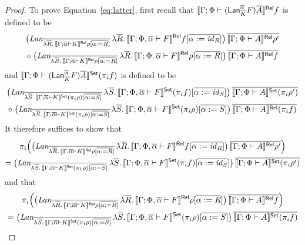 \documentclass{lmcs}
\theoremstyle{plain}\newtheorem{satz}[thm]{Satz}
\renewcommand{\id}{\mathit{id}}
\begin{document}
{\begin{proof}
To prove Equation~\ref{eq:latter}, first recall that
$\llbracket{ \Gamma; \Phi \vdash (\mathsf{Lan}^{\overline{\alpha}}_{\overline{K}} F)\overline{A} }\rrbracket^{\mathsf{Rel}}
f$ is defined to be
\begin{multline*}
\big(\textit{Lan}_{\ol{\lambda \ol{R}.\,\relsem{\Gamma; \ol\alpha
      \vdash K}\rho[\ol{\alpha := R}]}}\, \lambda
\ol{R}.\,\relsem{\Gamma; \Phi, \ol\alpha \vdash F}f[\ol{\alpha :=
    \id_R}]\big)\, \ol{\relsem{\Gamma; \Phi \vdash A}\rho'} \\ \circ\;
\big(\textit{Lan}_{\ol{\lambda \ol{R}.\,\relsem{\Gamma; \ol\alpha
      \vdash K}\rho[\ol{\alpha := R}]}}\, \lambda
\ol{R}.\,\relsem{\Gamma; \Phi, \ol\alpha \vdash F}\rho[\ol{\alpha :=
    R}]\big)\, \ol{\relsem{\Gamma; \Phi \vdash A}f}
\end{multline*}
and $\llbracket{\Gamma; \Phi \vdash (\mathsf{Lan}^{\overline{\alpha}}_{\overline{K}} F)\overline{A}
}\rrbracket^{\mathsf{Set}} (\pi_i f)$ is defined to be
\begin{multline*}
\big(\textit{Lan}_{\ol{\lambda \ol{S}.\,\setsem{\Gamma; \ol\alpha
      \vdash K}(\pi_i \rho)[\ol{\alpha := S}]}}\, \lambda
\ol{S}.\,\setsem{\Gamma; \Phi, \ol\alpha \vdash F}(\pi_i f)[\ol{\alpha
    := \id_S}]\big)\, \ol{\setsem{\Gamma; \Phi \vdash A}(\pi_i
  \rho')}\\ \circ\; \big(\textit{Lan}_{\ol{\lambda
    \ol{S}.\,\setsem{\Gamma; \ol\alpha \vdash K}(\pi_i
    \rho)[\ol{\alpha := S}]}}\, \lambda \ol{S}.\,\setsem{\Gamma; \Phi,
  \ol\alpha \vdash F}(\pi_i \rho)[\ol{\alpha := S}]\big)\,
\ol{\relsem{\Gamma; \Phi \vdash A}(\pi_i f)}
\end{multline*}
It therefore suffices to show that
\begin{multline}\label{eq:part-one}
\pi_i \Big( \big(\textit{Lan}_{\ol{\lambda \ol{R}.\,\relsem{\Gamma; \ol\alpha
      \vdash K}\rho[\ol{\alpha := R}]}}\,  
      \lambda \ol{R}.\,\relsem{\Gamma; \Phi, \ol\alpha \vdash F}f[\ol{\alpha := \id_R}]\big)\,
    \ol{\relsem{\Gamma; \Phi \vdash A}\rho'} \Big) \\
= \big(\textit{Lan}_{\ol{\lambda \ol{S}.\,\setsem{\Gamma; \ol\alpha
      \vdash K} (\pi_1 \rho) [\ol{\alpha := S}]}}\,  
      \lambda \ol{S}.\,\setsem{\Gamma; \Phi, \ol\alpha \vdash F}(\pi_i f)[\ol{\alpha := \id_S}]\big)\,
    \ol{\setsem{\Gamma; \Phi \vdash A}(\pi_i \rho')}
\end{multline}
and that
\begin{multline}\label{eq:part-two}
\pi_i \Big( \big(\textit{Lan}_{\overline{\lambda \overline{R}.\,\llbracket{\Gamma; \overline{\alpha}
        \vdash K}\rrbracket^{\mathsf{Rel}}\rho[\overline{\alpha := R}]}}\,  
      \lambda \overline{R}.\,\llbracket{\Gamma; \Phi, \overline{\alpha} \vdash F}\rrbracket^{\mathsf{Rel}}\rho[\overline{\alpha := R}]\big)\,
    \overline{\llbracket{\Gamma; \Phi \vdash A}\rrbracket^{\mathsf{Rel}}f} \Big) \\
= \big(\textit{Lan}_{\overline{\lambda \overline{S}.\,\llbracket{\Gamma; \overline{\alpha}
        \vdash K}\rrbracket^{\mathsf{Set}} (\pi_i \rho) [\overline{\alpha := S}]}}\,  
      \lambda \overline{S}.\,\llbracket{\Gamma; \Phi, \overline{\alpha} \vdash F}\rrbracket^{\mathsf{Set}} (\pi_i \rho) [\overline{\alpha := S}]\big)\,
    \overline{\llbracket{\Gamma; \Phi \vdash A}\rrbracket^{\mathsf{Set}} (\pi_i f)}
\end{multline}


\end{proof}}
\end{document}
